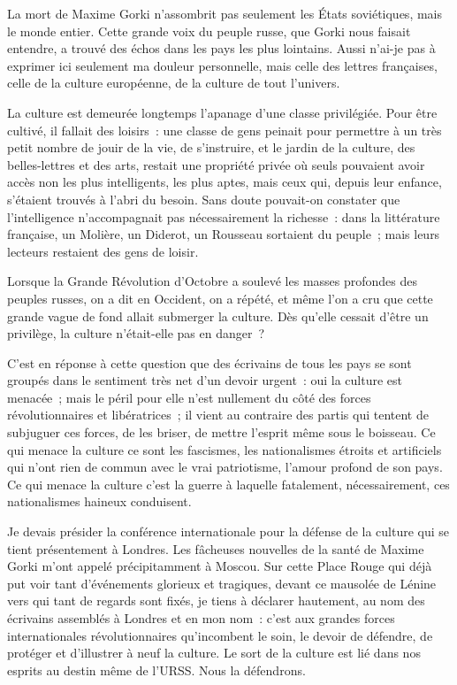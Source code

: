 \documentclass[french,twoside]{book} %
\begin{document}
\noindent La mort de Maxime Gorki n’assombrit pas seulement les États soviétiques, mais le monde entier. Cette grande voix du peuple russe, que Gorki nous faisait entendre, a trouvé des échos dans les pays les plus lointains. Aussi n’ai-je pas à exprimer ici seulement ma douleur personnelle, mais celle des lettres françaises, celle de la culture européenne, de la culture de tout l’univers.\par
La culture est demeurée longtemps l’apanage d’une classe privilégiée. Pour être cultivé, il fallait des loisirs : une classe de gens peinait pour permettre à un très petit nombre de jouir de la vie, de s’instruire, et le jardin de la culture, des belles-lettres et des arts, restait une propriété privée où seuls pouvaient avoir accès non les plus intelligents, les plus aptes, mais ceux qui, depuis leur enfance, s’étaient trouvés à l’abri du besoin. Sans doute pouvait-on constater que l’intelligence n’accompagnait pas nécessairement la richesse : dans la littérature française, un Molière, un Diderot, un Rousseau sortaient du peuple ; mais leurs lecteurs restaient des gens de loisir.\par
Lorsque la Grande Révolution d’Octobre a soulevé les masses profondes des peuples russes, on a dit en Occident, on a répété, et même l’on a cru que cette grande vague de fond allait submerger la culture. Dès qu’elle cessait d’être un privilège, la culture n’était-elle pas en danger ?\par
C’est en réponse à cette question que des écrivains de tous les pays se sont groupés dans le sentiment très net d’un devoir urgent : oui la culture est menacée ; mais le péril pour elle n’est nullement du côté des forces révolutionnaires et libératrices ; il vient au contraire des partis qui tentent de subjuguer ces forces, de les briser, de mettre l’esprit même sous le boisseau. Ce qui menace la culture ce sont les fascismes, les nationalismes étroits et artificiels qui n’ont rien de commun avec le vrai patriotisme, l’amour profond de son pays. Ce qui menace la culture c’est la guerre à laquelle fatalement, nécessairement, ces nationalismes haineux conduisent.\par
Je devais présider la conférence internationale pour la défense de la culture qui se tient présentement à Londres. Les fâcheuses nouvelles de la santé de Maxime Gorki m’ont appelé précipitamment à Moscou. Sur cette Place Rouge qui déjà put voir tant d’événements glorieux et tragiques, devant ce mausolée de Lénine vers qui tant de regards sont fixés, je tiens à déclarer hautement, au nom des écrivains assemblés à Londres et en mon nom : c’est aux grandes forces internationales révolutionnaires qu’incombent le soin, le devoir de défendre, de protéger et d’illustrer à neuf la culture. Le sort de la culture est lié dans nos esprits au destin même de l’URSS. Nous la défendrons.\par
\end{document}
